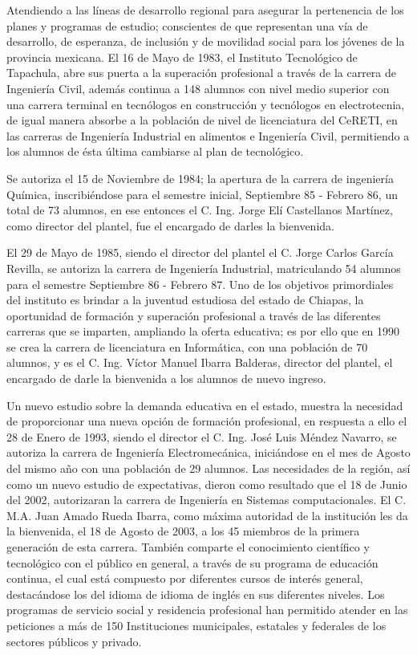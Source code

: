 Atendiendo a las líneas de desarrollo regional para asegurar la pertenencia de los planes y programas de estudio; conscientes de que representan una vía de desarrollo, de esperanza, de inclusión y de movilidad social para los jóvenes de la provincia mexicana. El 16 de Mayo de 1983, el Instituto Tecnológico de Tapachula, abre sus puerta a la superación profesional a través de la carrera de Ingeniería Civil, además continua a 148 alumnos con nivel medio superior con una carrera terminal en tecnólogos en construcción y tecnólogos en electrotecnia, de igual manera absorbe a la población de nivel de licenciatura del CeRETI, en las carreras de Ingeniería Industrial en alimentos e Ingeniería Civil, permitiendo a los alumnos de ésta última cambiarse al plan de tecnológico.

Se autoriza el 15 de Noviembre de 1984; la apertura de la carrera de ingeniería Química, inscribiéndose para el semestre inicial, Septiembre 85 - Febrero 86, un total de 73 alumnos, en ese entonces el C. Ing. Jorge Elí Castellanos Martínez, como director del plantel, fue el encargado de darles la bienvenida.

El 29 de Mayo de 1985, siendo el director del plantel el C. Jorge Carlos García Revilla, se autoriza la carrera de Ingeniería Industrial, matriculando 54 alumnos para el semestre Septiembre 86 - Febrero 87. Uno de los objetivos primordiales del instituto es brindar a la juventud estudiosa del estado de Chiapas, la oportunidad de formación y superación profesional a través de las diferentes carreras que se imparten, ampliando la oferta educativa; es por ello que en 1990 se crea la carrera de licenciatura en Informática, con una población de 70 alumnos, y es el C. Ing. Víctor Manuel Ibarra Balderas, director del plantel, el encargado de darle la bienvenida a los alumnos de nuevo ingreso.

Un nuevo estudio sobre la demanda educativa en el estado, muestra la necesidad de proporcionar una nueva opción de formación profesional, en respuesta a ello el 28 de Enero de 1993, siendo el director el C. Ing. José Luis Méndez Navarro, se autoriza la carrera de Ingeniería Electromecánica, iniciándose en el mes de Agosto del mismo año con una población de 29 alumnos. Las necesidades de la región, así como un nuevo estudio de expectativas, dieron como resultado que el 18 de Junio del 2002, autorizaran la carrera de Ingeniería en Sistemas computacionales. El C. M.A. Juan Amado Rueda Ibarra, como máxima autoridad de la institución les da la bienvenida, el 18 de Agosto de 2003, a los 45 miembros de la primera generación de esta carrera. También comparte el conocimiento científico y tecnológico con el público en general, a través de su programa de educación continua, el cual está compuesto por diferentes cursos de interés general, destacándose los del idioma de idioma de inglés en sus diferentes niveles. Los programas de servicio social y residencia profesional han permitido atender en las peticiones a más de 150 Instituciones municipales, estatales y federales de los sectores públicos y privado.

